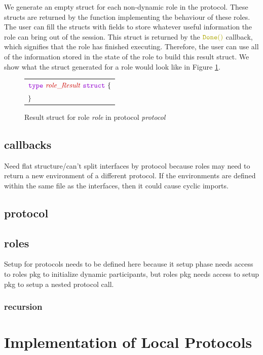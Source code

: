 \documentclass[12pt,twoside]{report}
\begin{document}
We generate an empty struct for each non-dynamic role in the protocol. These structs are returned by the function implementing the behaviour of these roles. The user can fill the structs with fields to store whatever useful information the role can bring out of the session. This struct is returned by the $\functionname{Done()}$ callback, which signifies that the role has finished executing. Therefore, the user can use all of the information stored in the state of the role to build this result struct. We show what the struct generated for a role would look like in Figure \ref{result-struct-gen}.

\begin{figure}[!h]
    \begin{center}
        \begin{tabular}{l}
            $\gotype\ \structname{role\_\!Result}\ \gostruct\ \{$\\[3pt]
            $\}$
        \end{tabular}
    \end{center}
    \caption{Result struct for role \textit{role} in protocol \textit{protocol}}
    \label{result-struct-gen}
\end{figure}

\subsection{callbacks}
Need flat structure/can't split interfaces by protocol because roles may need to return a new environment of a different protocol. If the environments are defined within the same file as the interfaces, then it could cause cyclic imports.
\subsection{protocol}\label{entry-point}
\subsection{roles}
Setup for protocols needs to be defined here because it setup phase needs access to roles pkg to initialize dynamic participants, but roles pkg needs access to setup pkg to setup a nested protocol call.
\subsubsection{recursion}

\section{Implementation of Local Protocols}\label{local-protocol-codegen}
\end{document}
